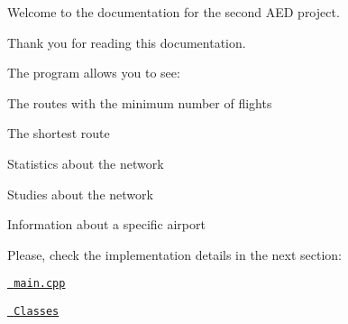 \label{index_md_main}%
%
 Welcome to the documentation for the second AED project.

Thank you for reading this documentation.

The program allows you to see\+:
\begin{DoxyEnumerate}
\item The routes with the minimum number of flights
\item The shortest route
\item Statistics about the network
\item Studies about the network
\item Information about a specific airport
\end{DoxyEnumerate}

Please, check the implementation details in the next section\+:


\begin{DoxyItemize}
\item \href{main_8cpp.html}{\texttt{ main.\+cpp}}
\item \href{annotated.html}{\texttt{ Classes}} 
\end{DoxyItemize}